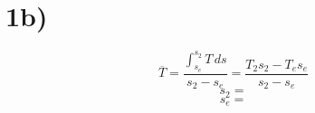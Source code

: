 

\section*{1b)}
\begin{equation*}
\overline{T} = \frac{\int_{s_e}^{s_2} T \, ds}{s_2 - s_e} = \frac{T_2 s_2 - T_e s_e}{s_2 - s_e}
\end{equation*}
\begin{equation*}
s_2 = 
\end{equation*}
\begin{equation*}
s_e = 
\end{equation*}